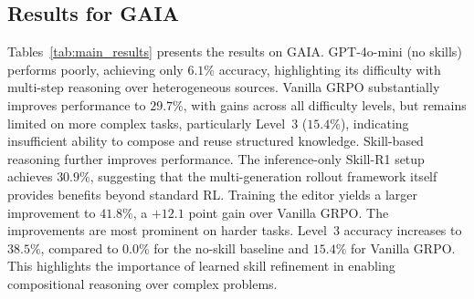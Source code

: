 \subsection{Results for GAIA}

\begin{table}[ht]
\centering
{}
\caption{Main results on the GAIA benchmark (165 tasks).}
\label{tab:main_results}
\end{table}

Tables~\ref{tab:main_results} presents the results on GAIA. GPT-4o-mini (no skills) performs poorly, achieving only $6.1\%$ accuracy, highlighting its difficulty with multi-step reasoning over heterogeneous sources. Vanilla GRPO substantially improves performance to $29.7\%$, with gains across all difficulty levels, but remains limited on more complex tasks, particularly Level~3 ($15.4\%$), indicating insufficient ability to compose and reuse structured knowledge. Skill-based reasoning further improves performance. The inference-only Skill-R1 setup achieves $30.9\%$, suggesting that the multi-generation rollout framework itself provides benefits beyond standard RL. Training the editor yields a larger improvement to $41.8\%$, a $+12.1$ point gain over Vanilla GRPO. The improvements are most prominent on harder tasks. Level~3 accuracy increases to $38.5\%$, compared to $0.0\%$ for the no-skill baseline and $15.4\%$ for Vanilla GRPO. This highlights the importance of learned skill refinement in enabling compositional reasoning over complex problems.


